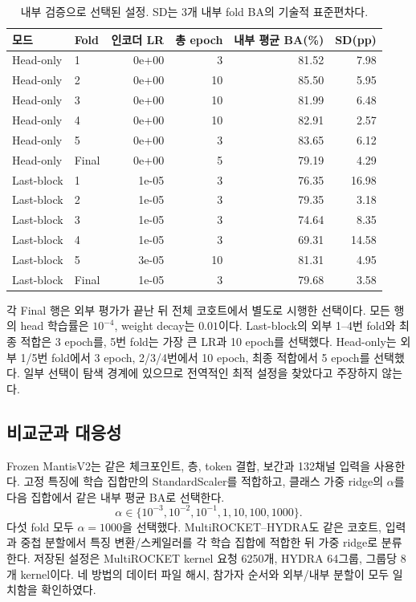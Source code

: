 \documentclass[11pt,a4paper]{article}
\begin{document}
\begin{table}[H]\centering\small
\caption{내부 검증으로 선택된 설정. SD는 3개 내부 fold BA의 기술적 표준편차다.}
\begin{tabular}{@{}llrrrr@{}}\toprule
모드 & Fold & 인코더 LR & 총 epoch & 내부 평균 BA(\%) & SD(pp)\\\midrule
Head-only & 1 & 0e+00 & 3 & 81.52 & 7.98 \\
Head-only & 2 & 0e+00 & 10 & 85.50 & 5.95 \\
Head-only & 3 & 0e+00 & 10 & 81.99 & 6.48 \\
Head-only & 4 & 0e+00 & 10 & 82.91 & 2.57 \\
Head-only & 5 & 0e+00 & 3 & 83.65 & 6.12 \\
Head-only & Final & 0e+00 & 5 & 79.19 & 4.29 \\
Last-block & 1 & 1e-05 & 3 & 76.35 & 16.98 \\
Last-block & 2 & 1e-05 & 3 & 79.35 & 3.18 \\
Last-block & 3 & 1e-05 & 3 & 74.64 & 8.35 \\
Last-block & 4 & 1e-05 & 3 & 69.31 & 14.58 \\
Last-block & 5 & 3e-05 & 10 & 81.31 & 4.95 \\
Last-block & Final & 1e-05 & 3 & 79.68 & 3.58 \\
\bottomrule\end{tabular}
\end{table}
각 Final 행은 외부 평가가 끝난 뒤 전체 코호트에서 별도로 시행한 선택이다.
모든 행의 head 학습률은 $10^{-4}$, weight decay는 $0.01$이다.
Last-block의 외부 1--4번 fold와 최종 적합은 3 epoch를,
5번 fold는 가장 큰 LR과 10 epoch를 선택했다.
Head-only는 외부 1/5번 fold에서 3 epoch, 2/3/4번에서 10 epoch,
최종 적합에서 5 epoch를 선택했다.
일부 선택이 탐색 경계에 있으므로 전역적인 최적 설정을 찾았다고 주장하지 않는다.

\subsection{비교군과 대응성}
Frozen MantisV2는 같은 체크포인트, 층, token 결합, 보간과 132채널 입력을 사용한다.
고정 특징에 학습 집합만의 StandardScaler를 적합하고,
클래스 가중 ridge의 $\alpha$를 다음 집합에서 같은 내부 평균 BA로 선택한다.
\begin{equation*}
 \alpha\in\{10^{-3},10^{-2},10^{-1},1,10,100,1000\}.
\end{equation*}
다섯 fold 모두 $\alpha=1000$을 선택했다.
MultiROCKET--HYDRA\cite{multirocket,hydra}도 같은 코호트, 입력과 중첩 분할에서
특징 변환/스케일러를 각 학습 집합에 적합한 뒤 가중 ridge로 분류한다.
저장된 설정은 MultiROCKET kernel 요청 6250개, HYDRA 64그룹, 그룹당 8개 kernel이다.
네 방법의 데이터 파일 해시, 참가자 순서와 외부/내부 분할이 모두 일치함을 확인하였다.
\clearpage
\end{document}
